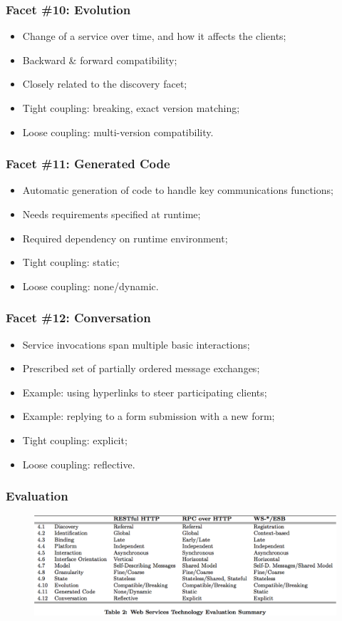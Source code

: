 \documentclass{beamer}
\begin{document}
\begin{frame}
    \frametitle{Facet \#10: Evolution}
    \begin{itemize}
        \item Change of a service over time, and how it affects the clients;
        \item Backward \& forward compatibility;
        \item Closely related to the discovery facet;
        \item Tight coupling: breaking, exact version matching;
        \item Loose coupling: multi-version compatibility.
    \end{itemize}
\end{frame}

\begin{frame}
    \frametitle{Facet \#11: Generated Code}
    \begin{itemize}
        \item Automatic generation of code to handle key communications functions;
        \item Needs requirements specified at runtime;
        \item Required dependency on runtime environment;
        \item Tight coupling: static;
        \item Loose coupling: none/dynamic.
    \end{itemize}
\end{frame}

\begin{frame}
    \frametitle{Facet \#12: Conversation}
    \begin{itemize}
        \item Service invocations span multiple basic interactions;
        \item Prescribed set of partially ordered message exchanges;
        \item Example: using hyperlinks to steer participating clients;
        \item Example: replying to a form submission with a new form;
        \item Tight coupling: explicit;
        \item Loose coupling: reflective.
    \end{itemize}
\end{frame}

\begin{frame}
    \frametitle{Evaluation}
    \begin{figure}
        \centering
        \includegraphics[width=0.8\paperwidth]{table2.png}
    \end{figure}
\end{frame}
\end{document}
